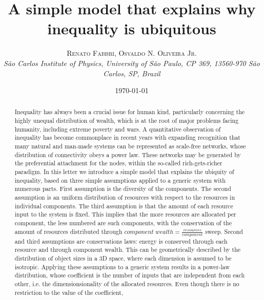 \documentclass[a4paper, 11pt]{article} %
\title{\textbf{A simple model that explains why inequality is ubiquitous}\\ %
} %
\author{\textsc{Renato Fabbri, Osvaldo N. Oliveira Jr.} %
\\{\textit{São Carlos Institute of Physics, University of São Paulo, CP 369, 13560-970 São Carlos, SP, Brazil}}} %
\date{\today} %
\makeatletter
\renewcommand{\maketitle}{ %
\begin{flushright} %
{\LARGE\@title} %

\vspace{5pt} %

{\large\@author} %
\\\@date %

\vspace{1pt} %
\end{flushright}
}
\makeatother
\begin{document}
\maketitle %



%
\begin{abstract}
	Inequality has always been a crucial issue for human kind, particularly concerning the highly unequal distribution of wealth, which is at the root of major problems facing humanity, including extreme poverty and wars.
	A quantitative observation of inequality has become commonplace in recent years
	with expanding recognition that many natural and man-made systems can be represented as scale-free networks,
	whose distribution of connectivity obeys a power law.
	These networks may be generated by the preferential attachment for the nodes, within the so-called rich-gets-richer paradigm.
	In this letter we introduce a simple model that explains the ubiquity of inequality, based on three simple assumptions applied to a generic system with numerous parts.
	First assumption is the diversity of the components.
	The second assumption is an uniform distribution of resources with respect to the resources in individual components.
	The third assumption is that the amount of each resource input to the system is fixed.
	This implies that the more resources are allocated per component, the less numbered are such components,
	with the conservation of the amount of resources distributed through $component\; wealth = \frac{resources}{component}$ sweep.
	Second and third assumptions are conservations laws: energy is conserved through each resource and through component wealth.
	This can be geometrically described by the distribution of object sizes in a 3D space, where each dimension is assumed to be isotropic.
	Applying these assumptions to a generic system results in a power-law distribution, whose coefficient is the number of inputs that are independent from each other, i.e. the dimensionsionality of the allocated resources.
	Even though there is no restriction to the value of the coefficient,

\end{abstract}
\end{document}
